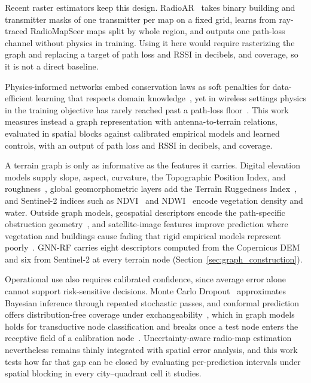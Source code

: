 \documentclass{ieeeaccess}
\begin{document}
Recent raster estimators keep this design. RadioAR~\cite{zheng2026radioar} takes binary building and transmitter masks of one transmitter per map on a fixed grid, learns from ray-traced RadioMapSeer maps split by whole region, and outputs one path-loss channel without physics in training. Using it here would require rasterizing the graph and replacing a target of path loss and RSSI in decibels, and coverage, so it is not a direct baseline.

Physics-informed networks embed conservation laws as soft penalties for data-efficient learning that respects domain knowledge~\cite{cheng2021deep}, yet in wireless settings physics in the training objective has rarely reached past a path-loss floor~\cite{feng2025recent,thrane2020model,zhang2023rme,celadesmartinez2026shadow}. This work measures instead a graph representation with antenna-to-terrain relations, evaluated in spatial blocks against calibrated empirical models and learned controls, with an output of path loss and RSSI in decibels, and coverage.

A terrain graph is only as informative as the features it carries. Digital elevation models supply slope, aspect, curvature, the Topographic Position Index, and roughness~\cite{guth2025benchmarking,trevisani2025surface}, global geomorphometric layers add the Terrain Ruggedness Index~\cite{amatulli2020geomorpho90m}, and Sentinel-2 indices such as NDVI~\cite{mzid2021analysis} and NDWI~\cite{du2016water} encode vegetation density and water. Outside graph models, geospatial descriptors encode the path-specific obstruction geometry~\cite{lorentelpez2026machine}, and satellite-image features improve prediction where vegetation and buildings cause fading that rigid empirical models represent poorly~\cite{thrane2020model}. GNN-RF carries eight descriptors computed from the Copernicus DEM and six from Sentinel-2 at every terrain node (Section~\ref{sec:graph_construction}).

Operational use also requires calibrated confidence, since average error alone cannot support risk-sensitive decisions. Monte Carlo Dropout~\cite{gal2016dropout} approximates Bayesian inference through repeated stochastic passes, and conformal prediction offers distribution-free coverage under exchangeability~\cite{zhou2025conformal}, which in graph models holds for transductive node classification and breaks once a test node enters the receptive field of a calibration node~\cite{zargarbashi2023conformal}. Uncertainty-aware radio-map estimation nevertheless remains thinly integrated with spatial error analysis, and this work tests how far that gap can be closed by evaluating per-prediction intervals under spatial blocking in every city--quadrant cell it studies.
\end{document}
